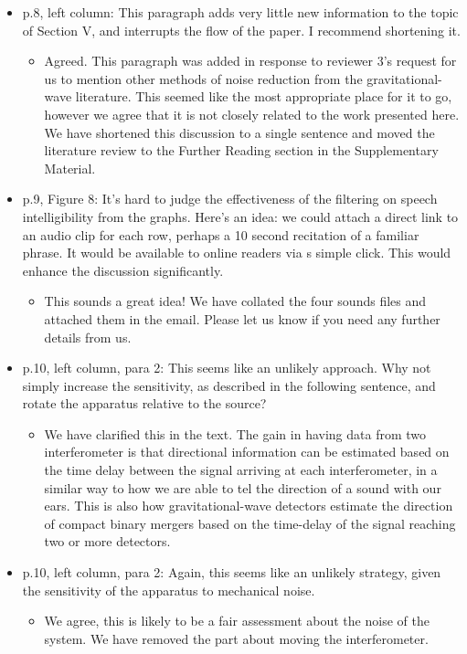 \documentclass[a4paper, 10pt]{letter}
\begin{document}
\begin{itemize}
\item p.8, left column: This paragraph adds very little new information to the topic of Section V, and interrupts the flow of the paper. I recommend shortening it. 
\begin{itemize}
\item Agreed. This paragraph was added in response to reviewer 3's request for us to mention other methods of noise reduction from the gravitational-wave literature. This seemed like the most appropriate place for it to go, however we agree that it is not closely related to the work presented here. We have shortened this discussion to a single sentence and moved the literature review to the Further Reading section in the Supplementary Material. 
\end{itemize}

\item p.9, Figure 8: It's hard to judge the effectiveness of the filtering on speech intelligibility from the graphs. Here's an idea: we could attach a direct link to an audio clip for each row, perhaps a 10 second recitation of a familiar phrase. It would be available to online readers via s simple click. This would enhance the discussion significantly.
\begin{itemize}
\item This sounds a great idea! We have collated the four sounds files and attached them in the email. Please let us know if you need any further details from us. 
\end{itemize}

\item p.10, left column, para 2: This seems like an unlikely approach. Why not simply increase the sensitivity, as described in the following sentence, and rotate the apparatus relative to the source?
\begin{itemize}
\item We have clarified this in the text. The gain in having data from two interferometer is that directional information can be estimated based on the time delay between the signal arriving at each interferometer, in a similar way to how we are able to tel the direction of a sound with our ears. This is also how gravitational-wave detectors estimate the direction of compact binary mergers based on the time-delay of the signal reaching two or more detectors. 
\end{itemize}

\item p.10, left column, para 2: Again, this seems like an unlikely strategy, given the sensitivity of the apparatus to mechanical noise. 
\begin{itemize}
\item We agree, this is likely to be a fair assessment about the noise of the system. We have removed the part about moving the interferometer. 
\end{itemize}


\end{itemize}
\end{document}
